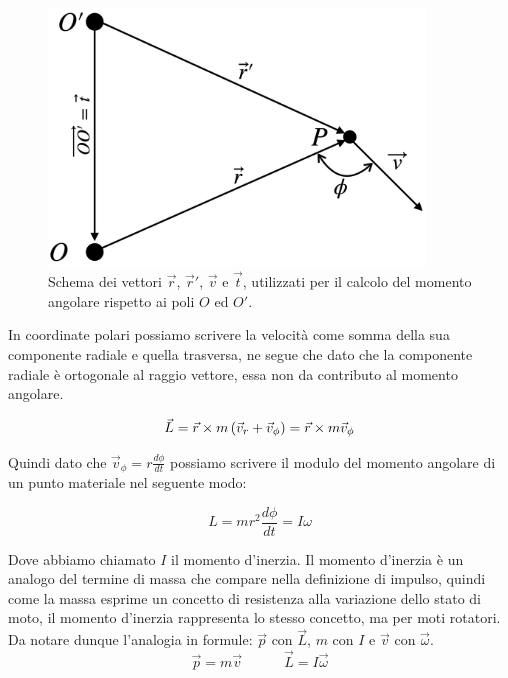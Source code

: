  \begin{figure}[htbp]
\begin{center}
\includegraphics[width=10cm]{images/momang1.png}
\caption{Schema dei vettori $\vec r$, $\vec r'$, $\vec v$ e $\vec t$, utilizzati per il calcolo del momento angolare rispetto ai poli $O$ ed $O'$.}
\label{default}
\end{center}
\end{figure}
In coordinate polari possiamo scrivere la velocità come somma della sua componente radiale e quella trasversa, ne segue che dato che la componente radiale è ortogonale al raggio vettore, essa non da contributo al momento angolare.

\begin{equation}
\vec L = \vec r \times m\left( \vec v_r+\vec v_\phi\right) = \vec r \times m\vec v_\phi
\end{equation}

Quindi dato che $\vec v_\phi = r\frac{d\phi}{dt}$ possiamo scrivere il modulo del momento angolare di un punto materiale nel seguente modo:

\begin{equation}
\boxed{L = mr^2\frac{d\phi}{dt} = I\omega}
\end{equation}

Dove abbiamo chiamato $I$ il momento d'inerzia. Il momento d'inerzia è un analogo del termine di massa che compare nella definizione di impulso, quindi come la massa esprime un concetto di resistenza alla variazione dello stato di moto, il momento d'inerzia rappresenta lo stesso concetto, ma per moti rotatori. Da notare dunque l'analogia in formule: $\vec p$ con $\vec L$, $m$ con $I$ e $\vec v$ con $\vec \omega$.
\begin{equation}
\vec p = m\vec v \quad\quad \quad \vec L = I\vec     \omega
\end{equation} 

